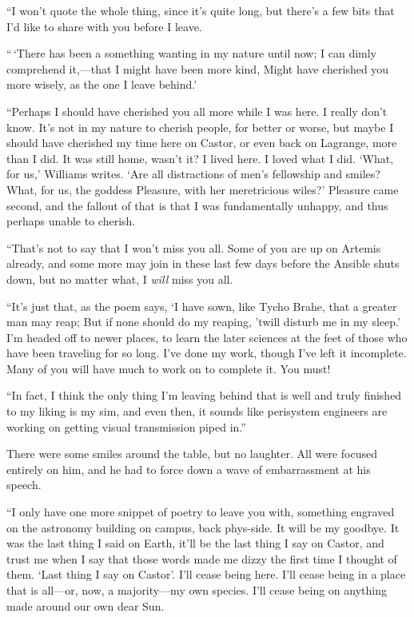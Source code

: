 ``I won't quote the whole thing, since it's quite long, but there's a few bits that I'd like to share with you before I leave.

``\,`There has been a something wanting in my nature until now; I can dimly comprehend it,—that I might have been more kind, Might have cherished you more wisely, as the one I leave behind.'

``Perhaps I should have cherished you all more while I was here. I really don't know. It's not in my nature to cherish people, for better or worse, but maybe I should have cherished my time here on Castor, or even back on Lagrange, more than I did. It was still home, wasn't it? I lived here. I loved what I did. `What, for us,' Williams writes. `Are all distractions of men's fellowship and smiles? What, for us, the goddess Pleasure, with her meretricious wiles?' Pleasure came second, and the fallout of that is that I was fundamentally unhappy, and thus perhaps unable to cherish.

``That's not to say that I won't miss you all. Some of you are up on Artemis already, and some more may join in these last few days before the Ansible shuts down, but no matter what, I \emph{will} miss you all.

``It's just that, as the poem says, `I have sown, like Tycho Brahe, that a greater man may reap; But if none should do my reaping, 'twill disturb me in my sleep.' I'm headed off to newer places, to learn the later sciences at the feet of those who have been traveling for so long. I've done my work, though I've left it incomplete. Many of you will have much to work on to complete it. You must!

``In fact, I think the only thing I'm leaving behind that is well and truly finished to my liking is my sim, and even then, it sounds like perisystem engineers are working on getting visual transmission piped in.''

There were some smiles around the table, but no laughter. All were focused entirely on him, and he had to force down a wave of embarrassment at his speech.

``I only have one more snippet of poetry to leave you with, something engraved on the astronomy building on campus, back phys-side. It will be my goodbye. It was the last thing I said on Earth, it'll be the last thing I say on Castor, and trust me when I say that those words made me dizzy the first time I thought of them. `Last thing I say on Castor'. I'll cease being here. I'll cease being in a place that is all—or, now, a majority—my own species. I'll cease being on anything made around our own dear Sun.

